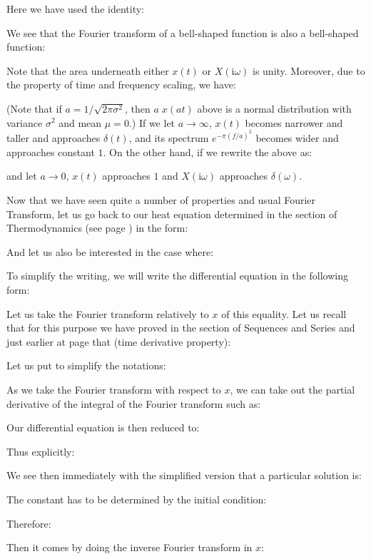 \begin{enumerate}
	Here we have used the identity:
	
	We see that the Fourier transform of a bell-shaped function is also a bell-shaped function:
	
	Note that the area underneath either $x(t)$ or $X(\mathrm{i}\omega)$ is unity. Moreover, due to the property of time and frequency scaling, we have:
	
	(Note that if $a=1/\sqrt{2\pi \sigma^2}$, then $a\;x(at)$ above is a normal 	distribution with variance $\sigma^2$ and mean $\mu=0$.) If we let $a \rightarrow \infty$, $x(t)$ becomes narrower and taller and  approaches $\delta(t)$, and its spectrum $e^{-\pi (f/a)^2}$ becomes wider and approaches constant $1$. On the other hand, if we rewrite the above as:
	
	and let $a \rightarrow 0$, $x(t)$ approaches $1$ and $X(\mathrm{i}\omega)$ approaches $\delta(\omega)$.
	
	\end{enumerate}
	
	Now that we have seen quite a number of properties and usual Fourier Transform, let us go back to our heat equation determined in the section of Thermodynamics (see page \pageref{heat equation}) in the form:
	
	And let us also be interested in the case where:
	
	To simplify the writing, we will write the differential equation in the following form:
	
	Let us take the Fourier transform relatively to $x$ of this equality. Let us recall that for this purpose we have proved in the section of Sequences and Series and just earlier at page \pageref{fourier transform time derivative} that (time derivative property):
	
	Let us put to simplify the notations:
	
	As we take the Fourier transform with respect to $x$, we can take out the partial derivative of the integral of the Fourier transform such as:
	
	Our differential equation is then reduced to:
	
	Thus explicitly:
	
	We see then immediately with the simplified version that a particular solution is:
	
	The constant has to be determined by the initial condition:
	
	Therefore:
	
	Then it comes by doing the inverse Fourier transform in $x$:
	
